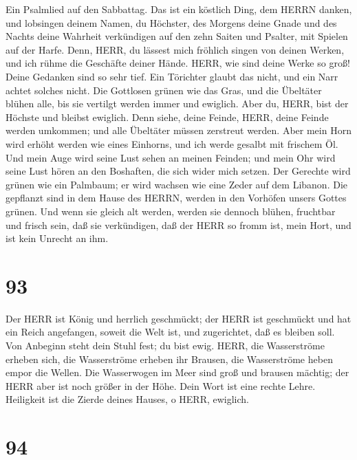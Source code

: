  Ein Psalmlied auf den Sabbattag. Das ist ein köstlich Ding,
dem HERRN danken, und lobsingen deinem Namen, du Höchster, 
des Morgens deine Gnade und des Nachts deine Wahrheit verkündigen
 auf den zehn Saiten und Psalter, mit Spielen auf der Harfe.
 Denn, HERR, du lässest mich fröhlich singen von deinen
Werken, und ich rühme die Geschäfte deiner Hände.  HERR, wie
sind deine Werke so groß! Deine Gedanken sind so sehr tief. 
Ein Törichter glaubt das nicht, und ein Narr achtet solches nicht.
 Die Gottlosen grünen wie das Gras, und die Übeltäter blühen
alle, bis sie vertilgt werden immer und ewiglich.  Aber du,
HERR, bist der Höchste und bleibst ewiglich.  Denn siehe,
deine Feinde, HERR, deine Feinde werden umkommen; und alle Übeltäter
müssen zerstreut werden.  Aber mein Horn wird erhöht werden
wie eines Einhorns, und ich werde gesalbt mit frischem Öl. 
Und mein Auge wird seine Lust sehen an meinen Feinden; und mein Ohr wird
seine Lust hören an den Boshaften, die sich wider mich setzen.
 Der Gerechte wird grünen wie ein Palmbaum; er wird wachsen
wie eine Zeder auf dem Libanon.  Die gepflanzt sind in dem
Hause des HERRN, werden in den Vorhöfen unsers Gottes grünen.
 Und wenn sie gleich alt werden, werden sie dennoch blühen,
fruchtbar und frisch sein,  daß sie verkündigen, daß der
HERR so fromm ist, mein Hort, und ist kein Unrecht an ihm.

\hypertarget{section-92}{%
\section{93}\label{section-92}}

 Der HERR ist König und herrlich geschmückt; der HERR ist
geschmückt und hat ein Reich angefangen, soweit die Welt ist, und
zugerichtet, daß es bleiben soll.  Von Anbeginn steht dein
Stuhl fest; du bist ewig.  HERR, die Wasserströme erheben
sich, die Wasserströme erheben ihr Brausen, die Wasserströme heben empor
die Wellen.  Die Wasserwogen im Meer sind groß und brausen
mächtig; der HERR aber ist noch größer in der Höhe.  Dein
Wort ist eine rechte Lehre. Heiligkeit ist die Zierde deines Hauses, o
HERR, ewiglich.

\hypertarget{section-93}{%
\section{94}\label{section-93}}

